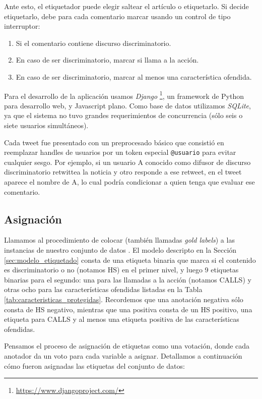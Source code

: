 Ante esto, el etiquetador puede elegir saltear el artículo o etiquetarlo. Si decide etiquetarlo, debe para cada comentario marcar usando un control de tipo interruptor:

\begin{enumerate}
    \item Si el comentario contiene discurso discriminatorio.
    \item En caso de ser discriminatorio, marcar si llama a la acción.
    \item En caso de ser discriminatorio, marcar al menos una característica ofendida.
\end{enumerate}

Para el desarrollo de la aplicación usamos \emph{Django} \footnote{\url{https://www.djangoproject.com/}}, un framework de Python para desarrollo web, y Javascript plano. Como base de datos utilizamos \emph{SQLite}, ya que el sistema no tuvo grandes requerimientos de concurrencia (sólo seis o siete usuarios simultáneos).


Cada tweet fue presentado con un preprocesado básico que consistió en reemplazar handles de usuarios por un token especial \verb|@usuario| para evitar cualquier sesgo. Por ejemplo, si un usuario A conocido como difusor de discurso discriminatorio retwittea la noticia y otro responde a ese retweet, en el tweet aparece el nombre de A, lo cual podría condicionar a quien tenga que evaluar ese comentario.


\subsection{Asignación}
\label{sec:asignacion}

Llamamos  al procedimiento de colocar  (también llamadas \emph{gold labels}) a las instancias de nuestro conjunto de datos \cite{pustejovsky2012natural}. El modelo descripto en la Sección \ref{sec:modelo_etiquetado} consta de una etiqueta binaria que marca si el contenido es discriminatorio o no (notamos HS) en el primer nivel, y luego 9 etiquetas binarias para el segundo: una para las llamadas a la acción (notamos CALLS) y otras ocho para las características ofendidas listadas en la Tabla \ref{tab:caracteristicas_protegidas}. Recordemos que una anotación negativa sólo consta de HS negativo, mientras que una positiva consta de un HS positivo, una etiqueta para CALLS y al menos una etiqueta positiva de las características ofendidas.

Pensamos el proceso de asignación de etiquetas como una votación, donde cada anotador da un voto para cada variable a asignar. Detallamos a continuación cómo fueron asignadas las etiquetas del conjunto de datos:

